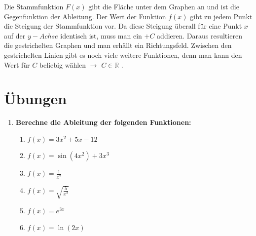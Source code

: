 \documentclass[a4paper,11pt]{report}
\begin{document}
Die Stammfunktion $F(x)$ gibt die Fläche unter dem Graphen an und ist die Gegenfunktion der Ableitung. Der Wert der Funktion $f(x)$ gibt zu jedem Punkt die Steigung der Stammfunktion vor.
Da diese Steigung überall für eine Punkt $x$ auf der $y-Achse$ identisch ist, muss man ein $+C$ addieren. Daraus resultieren die gestrichelten Graphen und man erhällt ein Richtungsfeld.
Zwischen den gestrichelten Linien gibt es noch viele weitere Funktionen, denn man kann den Wert für $C$ beliebig wählen $\rightarrow$ $C \in \mathbb{R}$ .

\newpage
\section{Übungen}
\begin{enumerate}
    \item \textbf{Berechne die Ableitung der folgenden Funktionen:}
    \begin{multicols}{2}
        \begin{enumerate}[label=(\alph*)]
            \item $f(x) = 3x^2 + 5x - 12$
            \item $f(x) = \sin(4x^2) + 3x^3$
            \item $f(x) = \frac{1}{x^2}$
            \item $f(x) = \sqrt{\frac{5}{x^2}}$
            \item $f(x) = e^{3x}$
            \item $f(x) = \ln(2x)$
        \end{enumerate}
    \end{multicols}
\end{enumerate}
\end{document}
